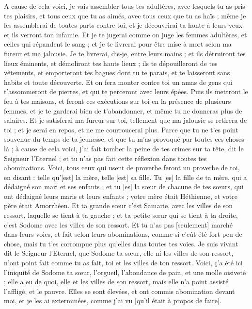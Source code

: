 \begin{multicols}{2}
A cause de cela voici, je vais assembler tous tes adultères, avec lesquels tu as pris tes plaisirs, et tous ceux que tu as aimés, avec tous ceux que tu as haïs ; même je les assemblerai de toutes parts contre toi, et je découvrirai ta honte à leurs yeux et ils verront ton infamie.
Et je te jugerai comme on juge les femmes adultères, et celles qui répandent le sang ; et je te livrerai pour être mise à mort selon ma fureur et ma jalousie.
Je te livrerai, dis-je, entre leurs mains ; et ils détruiront tes lieux éminents, et démoliront tes hauts lieux ; ils te dépouilleront de tes vêtements, et emporteront tes bagues dont tu te parais, et te laisseront sans habits et toute découverte.
Et on fera monter contre toi un amas de gens qui t'assommeront de pierres, et qui te perceront avec leurs épées.
Puis ils mettront le feu à tes maisons, et feront ces exécutions sur toi en la présence de plusieurs femmes, et je te garderai bien de t'abandonner, et même tu ne donneras plus de salaires.
Et je satisferai ma fureur sur toi, tellement que ma jalousie se retirera de toi ; et je serai en repos, et ne me courroucerai plus.
Parce que tu ne t'es point souvenue du temps de ta jeunesse, et que tu m'as provoqué par toutes ces choses-là ; à cause de cela voici, j'ai fait tomber la peine de tes crimes sur ta tête, dit le Seigneur l'Eternel ; et tu n'as pas fait cette réflexion dans toutes tes abominations.
Voici, tous ceux qui usent de proverbe feront un proverbe de toi, en disant : telle qu'[est] la mère, telle [est] sa fille.
Tu [es] la fille de ta mère, qui a dédaigné son mari et ses enfants ; et tu [es] la sœur de chacune de tes sœurs, qui ont dédaigné leurs maris et leurs enfants ; votre mère était Héthienne, et votre père était Amorrhéen.
Et ta grande sœur c'est Samarie, avec les villes de son ressort, laquelle se tient à ta gauche ; et ta petite sœur qui se tient à ta droite, c'est Sodome avec les villes de son ressort.
Et tu n'as pas [seulement] marché dans leurs voies, et fait selon leurs abominations, comme si c'eût été fort peu de chose, mais tu t'es corrompue plus qu'elles dans toutes tes voies.
Je suis vivant dit le Seigneur l'Eternel, que Sodome ta sœur, elle ni les villes de son ressort, n'ont point fait comme tu as fait, toi et les villes de ton ressort.
Voici, ç'a été ici l'iniquité de Sodome ta sœur, l'orgueil, l'abondance de pain, et une molle oisiveté ; elle a eu de quoi, elle et les villes de son ressort, mais elle n'a point assisté l'affligé, et le pauvre.
Elles se sont élevées, et ont commis abomination devant moi, et je les ai exterminées, comme j'ai vu [qu'il était à propos de faire].

\end{multicols}
